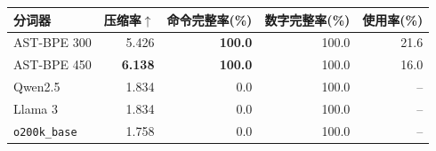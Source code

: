 \begin{tabular*}{\linewidth}{@{\extracolsep{\fill}}lrrrr@{}}\toprule
分词器 & 压缩率$\uparrow$ & 命令完整率(\%) & 数字完整率(\%) & 使用率(\%)\\\midrule
AST-BPE 300 & 5.426 & \textbf{100.0} & 100.0 & 21.6\\
AST-BPE 450 & \textbf{6.138} & \textbf{100.0} & 100.0 & 16.0\\
Qwen2.5 & 1.834 & 0.0 & 100.0 & --\\
Llama 3 & 1.834 & 0.0 & 100.0 & --\\
\texttt{o200k\_base} & 1.758 & 0.0 & 100.0 & --\\
\bottomrule\end{tabular*}